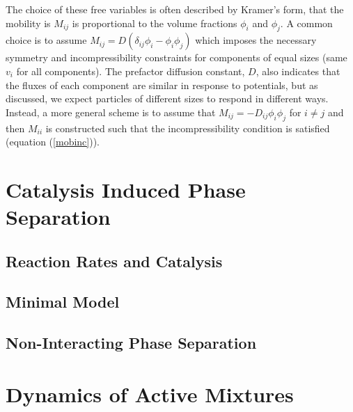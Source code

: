 The choice of these free variables is often described by Kramer's form\cite{KRAMER1984473}, that the mobility is $M_{ij}$ is proportional to the volume fractions $\phi_i$ and $\phi_j$. A common choice is to assume $M_{ij} = D(\delta_{ij}\phi_i - \phi_i\phi_j)$ which imposes the necessary  symmetry and incompressibility constraints for components of equal sizes (same $v_i$ for all components). The prefactor diffusion constant, $D$, also indicates that the fluxes of each component are similar in response to potentials, but as discussed, we expect particles of different sizes to respond in different ways. Instead, a more general scheme is to assume that $M_{ij} = -D_{ij}\phi_i\phi_j$ for $i \neq j$ and then $M_{ii}$ is constructed such that the incompressibility condition is satisfied (equation (\ref{mobinc})).

\section{Catalysis Induced Phase Separation}

\subsection{Reaction Rates and Catalysis}

\subsection{Minimal Model}

\subsection{Non-Interacting Phase Separation}

\section{Dynamics of Active Mixtures}

